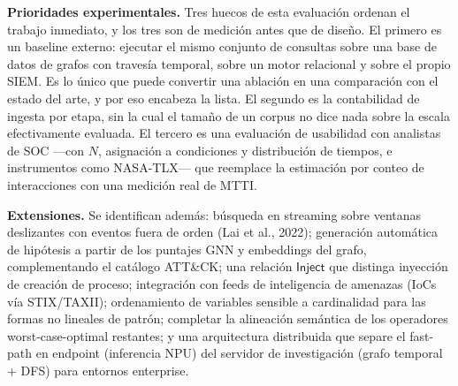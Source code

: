 \documentclass[11pt,a4paper]{article}
\begin{document}
\textbf{Prioridades experimentales.} Tres huecos de esta evaluación ordenan el
trabajo inmediato, y los tres son de medición antes que de diseño. El primero
es un baseline externo: ejecutar el mismo conjunto de consultas sobre una base
de datos de grafos con travesía temporal, sobre un motor relacional y sobre el
propio SIEM. Es lo único que puede convertir una ablación en una comparación
con el estado del arte, y por eso encabeza la lista. El segundo es la
contabilidad de ingesta por etapa, sin la cual el tamaño de un corpus no dice
nada sobre la escala efectivamente evaluada. El tercero es una evaluación de
usabilidad con analistas de SOC ---con $N$, asignación a condiciones y
distribución de tiempos, e instrumentos como NASA-TLX--- que reemplace la
estimación por conteo de interacciones con una medición real de MTTI.

\textbf{Extensiones.} Se identifican además: búsqueda en streaming sobre
ventanas deslizantes con eventos fuera de orden (Lai et al., 2022); generación
automática de hipótesis a partir de los puntajes GNN y embeddings del grafo,
complementando el catálogo ATT\&CK; una relación $\mathsf{Inject}$ que
distinga inyección de creación de proceso; integración con feeds de
inteligencia de amenazas (IoCs vía STIX/TAXII); ordenamiento de variables
sensible a cardinalidad para las formas no lineales de patrón; completar la
alineación semántica de los operadores worst-case-optimal restantes; y una
arquitectura distribuida que separe el fast-path en endpoint (inferencia NPU)
del servidor de investigación (grafo temporal + DFS) para entornos enterprise.

\end{document}
